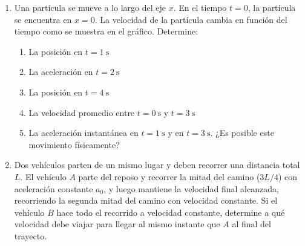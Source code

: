 \documentclass[letterpaper,11pt]{article}
\begin{document}
\begin{enumerate}\setlength{\itemsep}{0.4cm}

\item Una partícula se mueve a lo largo del eje $x$. En el tiempo $t=0$, la partícula se encuentra en $x=0$. La velocidad de la partícula cambia en función del tiempo como se muestra en el gráfico. Determine:

{
    \begin{multicols}{2}
        \begin{enumerate}
            
            \item La posición en $t=\SI{1}{\second}$
            
            \item La aceleración en $t=\SI{2}{\second}$
            
            \item La posición en $t=\SI{4}{\second}$
            
            \item La velocidad promedio entre $t=\SI{0}{\second}$ y $t=\SI{3}{\second}$
            
            \item La aceleración instantánea en $t=\SI{1}{\second}$ y en $t=\SI{3}{\second}$. ¿Es posible este movimiento físicamente?
        \end{enumerate}
        
        \columnbreak
        
        \begin{figure}[H]
            \centering
            
        \end{figure}
    \end{multicols}
}

\item Dos vehículos parten de un mismo lugar y deben recorrer una distancia total $L$. El vehículo $A$ parte del reposo y recorrer la mitad del camino ($3L/4$) con aceleración constante $a_0$, y luego mantiene la velocidad final alcanzada, recorriendo la segunda mitad del camino con velocidad constante. Si el vehículo $B$ hace todo el recorrido a velocidad constante, determine a qué velocidad debe viajar para llegar al mismo instante que $A$ al final del trayecto.

\begin{figure}[H]
    \centering
    
\end{figure}



\end{enumerate}
\end{document}
